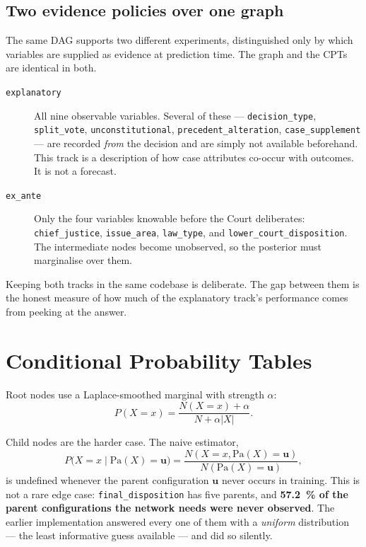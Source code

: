 \documentclass[11pt]{article}
\newcommand{\dispo}{\texttt{final\_disposition}}
\newcommand{\code}[1]{\texttt{#1}}
\begin{document}
\subsection{Two evidence policies over one graph}
\label{sec:tracks}

The same DAG supports two different experiments, distinguished only by which
variables are supplied as evidence at prediction time. The graph and the CPTs
are identical in both.

\begingroup\sloppy
\begin{description}
  \item[\code{explanatory}] All nine observable variables. Several of these ---
    \code{decision\_type}, \code{split\_vote}, \code{unconstitutional},
    \code{precedent\_alteration}, \code{case\_supplement} --- are recorded
    \emph{from} the decision and are simply not available beforehand. This track
    is a description of how case attributes co-occur with outcomes. It is not a
    forecast.
  \item[\code{ex\_ante}] Only the four variables knowable before the Court
    deliberates: \code{chief\_justice}, \code{issue\_area}, \code{law\_type},
    and \code{lower\_court\_disposition}. The intermediate nodes become
    unobserved, so the posterior must marginalise over them.
\end{description}
\endgroup

Keeping both tracks in the same codebase is deliberate. The gap between them is
the honest measure of how much of the explanatory track's performance comes from
peeking at the answer.

\section{Conditional Probability Tables}
\label{sec:cpt}

Root nodes use a Laplace-smoothed marginal with strength $\alpha$:
\[
  P(X = x) = \frac{N(X = x) + \alpha}{N + \alpha \lvert X \rvert}.
\]

Child nodes are the harder case. The naive estimator,
\[
  P\big(X = x \mid \mathrm{Pa}(X) = \mathbf{u}\big)
  = \frac{N(X = x, \mathrm{Pa}(X) = \mathbf{u})}{N(\mathrm{Pa}(X) = \mathbf{u})},
\]
is undefined whenever the parent configuration $\mathbf{u}$ never occurs in
training. This is not a rare edge case: \dispo{} has five parents, and
\textbf{\SI{57.2}{\percent} of the parent configurations the network needs were
never observed}. The earlier implementation answered every one of them with a
\emph{uniform} distribution --- the least informative guess available --- and
did so silently.
\end{document}
